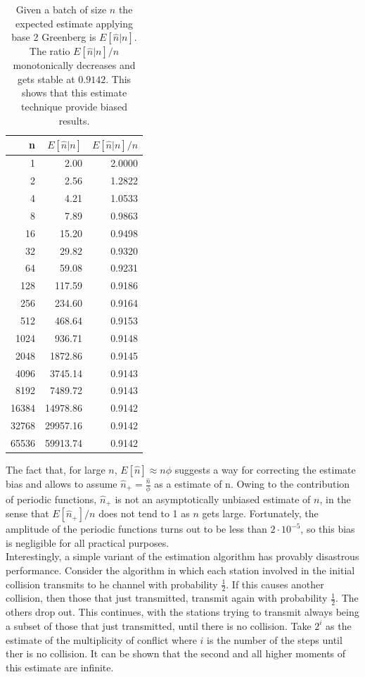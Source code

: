 \documentclass[12pt,a4paper]{report}
\begin{document}
\begin{table}[H]
\caption[\emph{Basic Greenberg}: Expected Estimate]{Given a batch of size $n$ the expected estimate applying base 2 Greenberg is $E[\hat{n}|n]$. The ratio $E[\hat{n}|n]/n$ monotonically decreases and gets stable at $0.9142$. This shows that this estimate technique provide biased results.}
\begin{center}
\begin{tabular}{rD{.}{.}{5.2}D{.}{.}{1.4}}
 n &  &  \\ \hline {} &     2.00 &   2.0000 \\ 
2 &     2.56 &   1.2822 \\ 
4 &     4.21 &   1.0533 \\ 
8 &     7.89 &   0.9863 \\ 
16 &  15.20 &   0.9498 \\ 
32 &    29.82 &   0.9320 \\ 
64 &    59.08 &   0.9231 \\ 
128 &   117.59 &   0.9186 \\ 
256 &   234.60 &   0.9164 \\ 
512 &   468.64 &   0.9153 \\ 
1024 &   936.71 &   0.9148 \\ 
2048 &  1872.86 &   0.9145 \\ 
4096 &  3745.14 &   0.9143 \\ 
8192 &  7489.72 &   0.9143 \\ 
16384 & 14978.86 &   0.9142 \\ 
32768 & 29957.16 &   0.9142 \\ 
65536 & 59913.74 &   0.9142
\end{tabular}
\end{center}
\label{table:phi-Phi}
\end{table}
The fact that, for large $n$, $E[\hat{n}] \approx n\phi$ suggests a way for correcting the estimate bias and allows to assume $\hat{n}_{+} = {\displaystyle\frac{\hat{n}}{\phi}}$ as a estimate of n. Owing to the contribution of periodic functions, $\hat{n}_{+}$ is not an asymptotically unbiased estimate of $n$, in the sense that  $E[\hat{n}_{+}]/n$ does not tend to 1 as $n$ gets large. Fortunately, the amplitude of the periodic functions turns out to be less than $2 \cdot10^{-5}$, so this bias is negligible for all practical purposes.\\


Interestingly, a simple variant of the estimation algorithm has provably disastrous performance. Consider the algorithm in which each station involved in the initial collision transmits to he channel with probability $\frac{1}{2}$. If this causes another collision, then those that just transmitted, transmit again with probability $\frac{1}{2}$. The others drop out. This continues, with the stations trying to transmit always being a subset of those that just transmitted, until there is no collision. Take $2^{i}$ as the estimate of the multiplicity of conflict where $i$ is the number of the steps until ther is no collision. It can be shown that the second and all higher moments of this estimate are infinite.
\end{document}
